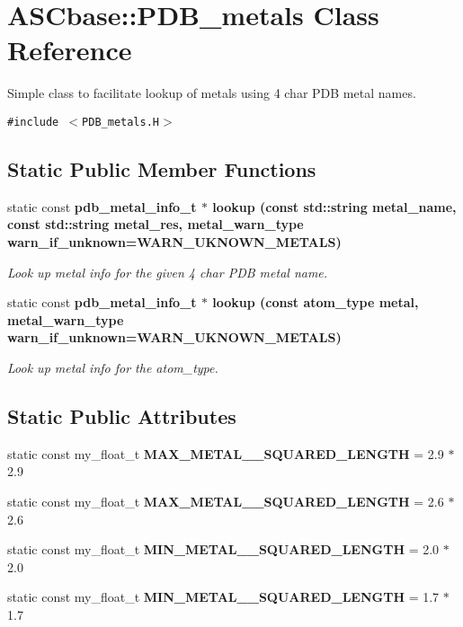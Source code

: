 \section{ASCbase::PDB\_\-metals Class Reference}
\label{classASCbase_1_1PDB__metals}
Simple class to facilitate lookup of metals using 4 char PDB metal names.  


{\tt \#include $<$PDB\_\-metals.H$>$}

\subsection*{Static Public Member Functions}
\begin{CompactItemize}
\item 
static const \bf{pdb\_\-metal\_\-info\_\-t} $\ast$ \bf{lookup} (const std::string metal\_\-name, const std::string metal\_\-res, metal\_\-warn\_\-type warn\_\-if\_\-unknown=WARN\_\-UKNOWN\_\-METALS)
\begin{CompactList}\small\item\em Look up metal info for the given 4 char PDB metal name. \item\end{CompactList}\item 
static const \bf{pdb\_\-metal\_\-info\_\-t} $\ast$ \bf{lookup} (const atom\_\-type metal, metal\_\-warn\_\-type warn\_\-if\_\-unknown=WARN\_\-UKNOWN\_\-METALS)
\begin{CompactList}\small\item\em Look up metal info for the atom\_\-type. \item\end{CompactList}\end{CompactItemize}
\subsection*{Static Public Attributes}
\begin{CompactItemize}
\item 
static const my\_\-float\_\-t \textbf{MAX\_\-METAL\_\_\-SQUARED\_\-LENGTH} = 2.9 $\ast$ 2.9\label{classASCbase_1_1PDB__metals_ccfed2ea9c7249c7a3c8c2f9b6a896fe}

\item 
static const my\_\-float\_\-t \textbf{MAX\_\-METAL\_\_\-SQUARED\_\-LENGTH} = 2.6 $\ast$ 2.6\label{classASCbase_1_1PDB__metals_41d57fb651b1afe0b2bdb68a51ff5642}

\item 
static const my\_\-float\_\-t \textbf{MIN\_\-METAL\_\_\-SQUARED\_\-LENGTH} = 2.0 $\ast$ 2.0\label{classASCbase_1_1PDB__metals_085856c7568fa2d9d9c2ef26fe41df1f}

\item 
static const my\_\-float\_\-t \textbf{MIN\_\-METAL\_\_\-SQUARED\_\-LENGTH} = 1.7 $\ast$ 1.7\label{classASCbase_1_1PDB__metals_d83053987cd3dedfc2dd399d6aa8881c}

\end{CompactItemize}
